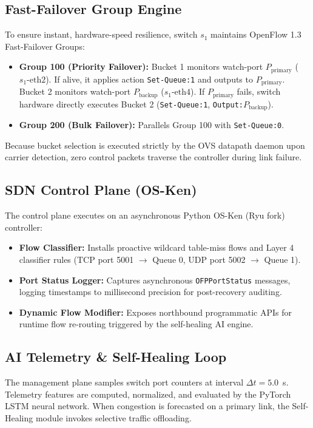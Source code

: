 \documentclass[conference]{IEEEtran}
\begin{document}
\subsection{Fast-Failover Group Engine}
To ensure instant, hardware-speed resilience, switch $s_1$ maintains OpenFlow 1.3 Fast-Failover Groups:
\begin{itemize}
    \item \textbf{Group 100 (Priority Failover):} Bucket 1 monitors watch-port $P_{\text{primary}}$ ($s_1\text{-eth2}$). If alive, it applies action \texttt{Set-Queue:1} and outputs to $P_{\text{primary}}$. Bucket 2 monitors watch-port $P_{\text{backup}}$ ($s_1\text{-eth4}$). If $P_{\text{primary}}$ fails, switch hardware directly executes Bucket 2 (\texttt{Set-Queue:1}, \texttt{Output:}$P_{\text{backup}}$).
    \item \textbf{Group 200 (Bulk Failover):} Parallels Group 100 with \texttt{Set-Queue:0}.
\end{itemize}
Because bucket selection is executed strictly by the OVS datapath daemon upon carrier detection, zero control packets traverse the controller during link failure.

\subsection{SDN Control Plane (OS-Ken)}
The control plane executes on an asynchronous Python OS-Ken (Ryu fork) controller:
\begin{itemize}
    \item \textbf{Flow Classifier:} Installs proactive wildcard table-miss flows and Layer 4 classifier rules (TCP port 5001 $\rightarrow$ Queue 0, UDP port 5002 $\rightarrow$ Queue 1).
    \item \textbf{Port Status Logger:} Captures asynchronous \texttt{OFPPortStatus} messages, logging timestamps to millisecond precision for post-recovery auditing.
    \item \textbf{Dynamic Flow Modifier:} Exposes northbound programmatic APIs for runtime flow re-routing triggered by the self-healing AI engine.
\end{itemize}

\subsection{AI Telemetry \& Self-Healing Loop}
The management plane samples switch port counters at interval $\Delta t = 5.0$~s. Telemetry features are computed, normalized, and evaluated by the PyTorch LSTM neural network. When congestion is forecasted on a primary link, the Self-Healing module invokes selective traffic offloading.
\end{document}
